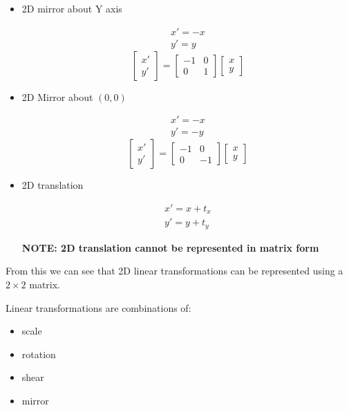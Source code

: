 \documentclass{article}
\begin{document}
\begin{itemize}
  \item 2D mirror about Y axis

        \begin{align*}
          x' = -x\\
          y' = y
        \end{align*}
\[
  \begin{bmatrix}
    x'\\ y'
  \end{bmatrix} =
  \begin{bmatrix}
    -1 & 0 \\
    0 & 1
  \end{bmatrix}\begin{bmatrix}
    x \\ y
  \end{bmatrix}
        \]

  \item 2D Mirror about $(0,0)$

        \begin{align*}
          x' = -x\\
          y' = -y
        \end{align*}
\[
  \begin{bmatrix}
    x'\\ y'
  \end{bmatrix} =
  \begin{bmatrix}
    -1 & 0 \\
    0 & -1
  \end{bmatrix}\begin{bmatrix}
    x \\ y
  \end{bmatrix}
        \]
  \item 2D translation

       \begin{align*}
         x' = x + t_{x}\\
         y' = y + t_{y}
       \end{align*}

        \textbf{NOTE: 2D translation cannot be represented in matrix form}
\end{itemize}

From this we can see that 2D linear transformations can be represented using a $2\times 2$ matrix.

Linear transformations are combinations of:

\begin{itemize}
  \item scale
  \item rotation
  \item shear
  \item mirror
\end{itemize}
\end{document}
